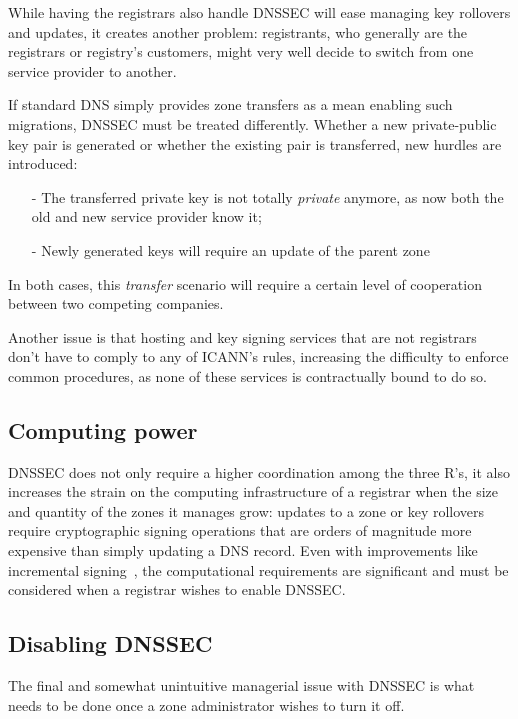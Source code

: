 \documentclass[a4paper,twocolumn]{scrartcl}
\begin{document}
While having the registrars also handle DNSSEC will ease managing key rollovers and updates, it creates another problem: registrants, who generally are the registrars or registry's customers, might very well decide to switch from one service provider to another.

If standard DNS simply provides zone transfers as a mean enabling such migrations, DNSSEC must be treated differently. Whether a new private-public key pair is generated or whether the existing pair is transferred, new hurdles are introduced:

\begin{itemize}
\item[-] The transferred private key is not totally \emph{private} anymore, as now both the old and new service provider know it;
\item[-] Newly generated keys will require an update of the parent zone
\end{itemize}

In both cases,  this \emph{transfer} scenario will require a certain level of cooperation between two competing companies.

Another issue is that hosting and key signing services that are not registrars don't have to comply to any of ICANN's rules, increasing the difficulty to enforce common procedures, as none of these services is contractually bound to do so.

\subsection{Computing power}
DNSSEC does not only require a higher coordination among the three R's, it also increases the strain on the computing infrastructure of a registrar when the size and quantity of the  zones it manages grow: updates to a zone or key rollovers require cryptographic signing operations that are orders of magnitude more expensive than simply updating a DNS record. Even with improvements like incremental signing~\cite{signMetrics}, the computational requirements are significant and must be considered when a registrar wishes to enable DNSSEC.

\subsection{Disabling DNSSEC}
The final and somewhat unintuitive managerial issue with DNSSEC is what needs to be done once a zone administrator wishes to turn it off. 
\end{document}
